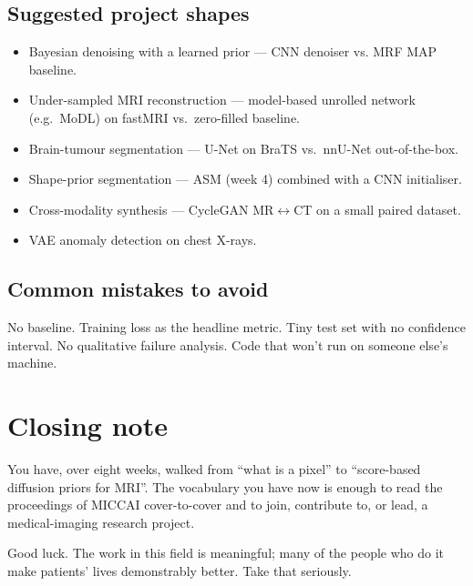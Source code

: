 \documentclass[11pt,a4paper]{article}
\begin{document}
\subsection{Suggested project shapes}

\begin{itemize}[leftmargin=*,nosep]
  \item Bayesian denoising with a learned prior --- CNN denoiser vs.
        MRF MAP baseline.
  \item Under-sampled MRI reconstruction --- model-based unrolled
        network (e.g.\ MoDL) on fastMRI vs.\ zero-filled baseline.
  \item Brain-tumour segmentation --- U-Net on BraTS vs.\
        nnU-Net out-of-the-box.
  \item Shape-prior segmentation --- ASM (week 4) combined with a
        CNN initialiser.
  \item Cross-modality synthesis --- CycleGAN MR$\leftrightarrow$CT
        on a small paired dataset.
  \item VAE anomaly detection on chest X-rays.
\end{itemize}

\subsection{Common mistakes to avoid}

No baseline. Training loss as the headline metric. Tiny test set
with no confidence interval. No qualitative failure analysis. Code
that won't run on someone else's machine.

\section*{Closing note}


You have, over eight weeks, walked from ``what is a pixel'' to
``score-based diffusion priors for MRI''. The vocabulary you have now
is enough to read the proceedings of MICCAI cover-to-cover and to
join, contribute to, or lead, a medical-imaging research project.

Good luck. The work in this field is meaningful; many of the people
who do it make patients' lives demonstrably better. Take that
seriously.
\end{document}
